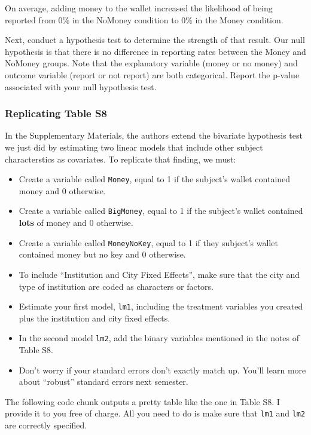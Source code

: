 \documentclass[12pt,halfline,a4paper,]{ouparticle}
\providecommand{\tightlist}{%
  \setlength{\itemsep}{0pt}\setlength{\parskip}{0pt}}
\begin{document}
On average, adding money to the wallet increased the likelihood of being
reported from 0\% in the NoMoney condition to 0\% in the Money
condition.

Next, conduct a hypothesis test to determine the strength of that
result. Our null hypothesis is that there is no difference in reporting
rates between the Money and NoMoney groups. Note that the explanatory
variable (money or no money) and outcome variable (report or not report)
are both categorical. Report the p-value associated with your null
hypothesis test.

\hypertarget{replicating-table-s8}{%
\subsubsection{Replicating Table S8}\label{replicating-table-s8}}

In the Supplementary Materials, the authors extend the bivariate
hypothesis test we just did by estimating two linear models that include
other subject characterstics as covariates. To replicate that finding,
we must:

\begin{itemize}
\tightlist
\item
  Create a variable called \texttt{Money}, equal to 1 if the subject's
  wallet contained money and 0 otherwise.
\item
  Create a variable called \texttt{BigMoney}, equal to 1 if the
  subject's wallet contained \textbf{lots} of money and 0 otherwise.
\item
  Create a variable called \texttt{MoneyNoKey}, equal to 1 if they
  subject's wallet contained money but no key and 0 otherwise.
\item
  To include ``Institution and City Fixed Effects'', make sure that the
  city and type of institution are coded as characters or factors.
\item
  Estimate your first model, \texttt{lm1}, including the treatment
  variables you created plus the institution and city fixed effects.
\item
  In the second model \texttt{lm2}, add the binary variables mentioned
  in the notes of Table S8.
\item
  Don't worry if your standard errors don't exactly match up. You'll
  learn more about ``robust'' standard errors next semester.
\end{itemize}

The following code chunk outputs a pretty table like the one in Table
S8. I provide it to you free of charge. All you need to do is make sure
that \texttt{lm1} and \texttt{lm2} are correctly specified.
\end{document}

